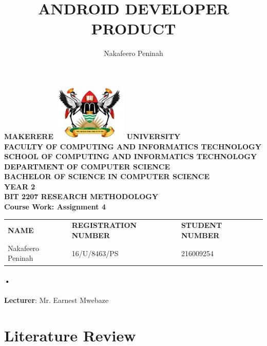 \documentclass[7pt]{article}
\begin{document}
\begin{Huge}
\begin{center}
\begin{normalsize}
\textbf{MAKERERE \includegraphics[scale=0.5]{logo} UNIVERSITY }\\

\textbf{FACULTY OF COMPUTING AND INFORMATICS TECHNOLOGY} \\
\textbf{SCHOOL OF COMPUTING AND INFORMATICS TECHNOLOGY} \\
\textbf{DEPARTMENT OF COMPUTER SCIENCE} \\
\textbf{BACHELOR OF SCIENCE IN COMPUTER SCIENCE} \\
\textbf{YEAR 2} \\
\textbf{BIT 2207 RESEARCH METHODOLOGY} \\
\textbf{Course Work: Assignment 4}\\
\end{normalsize}
\end{center}
\end{Huge}

\begin{center}
\begin{tabular}{l l l}
\textbf{NAME}  & \textbf{REGISTRATION NUMBER} & \textbf{STUDENT NUMBER} \\
Nakafeero Peninah & 16/U/8463/PS & 216009254 \\
\end{tabular}

\paragraph{•}
\textbf{Lecturer}: Mr. Earnest Mwebaze
\end{center}

\newpage

\title{ANDROID DEVELOPER PRODUCT}
\author{Nakafeero Peninah}      
\renewcommand{\today}{}

\maketitle

\section*{Literature Review}
\end{document}

